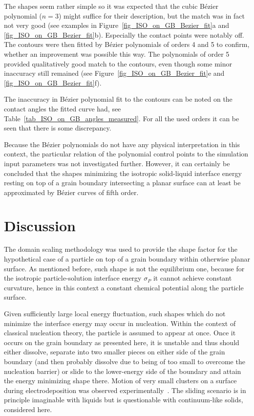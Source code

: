 The shapes seem rather simple so it was expected that the cubic Bézier polynomial ($n=3$) might suffice for their description, but the match was in fact not very good (see examples in Figure~\ref{fig_ISO_on_GB_Bezier_fit}a and \ref{fig_ISO_on_GB_Bezier_fit}b). Especially the contact points were notably off. The contours were then fitted by Bézier polynomials of orders 4 and 5 to confirm, whether an improvement was possible this way. The polynomials of order 5 provided qualitatively good match to the contours, even though some minor inaccuracy still remained (see Figure~\ref{fig_ISO_on_GB_Bezier_fit}e and \ref{fig_ISO_on_GB_Bezier_fit}f). 

The inaccuracy in Bézier polynomial fit to the contours can be noted on the contact angles the fitted curve had, see Table~\ref{tab_ISO_on_GB_angles_measured}. For all the used orders it can be seen that there is some discrepancy.

Because the Bézier polynomials do not have any physical interpretation in this context, the particular relation of the polynomial control points to the simulation input parameters was not investigated further. However, it can certainly be concluded that the shapes minimizing the isotropic solid-liquid interface energy resting on top of a grain boundary intersecting a planar surface can at least be approximated by Bézier curves of fifth order.

\section{Discussion}
The domain scaling methodology was used to provide the shape factor for the hypothetical case of a particle on top of a grain boundary within otherwise planar surface. As mentioned before, such shape is not the equilibrium one, because for the isotropic particle-solution interface energy $\sigma_P$ it cannot achieve constant curvature, hence in this context a constant chemical potential along the particle surface. 

Given sufficiently large local energy fluctuation, such shapes which do not minimize the interface energy may occur in nucleation. Within the context of classical nucleation theory, the particle is assumed to appear at once. Once it occurs on the grain boundary as presented here, it is unstable and thus should either dissolve, separate into two smaller pieces on either side of the grain boundary (and then probably dissolve due to being of too small to overcome the nucleation barrier) or slide to the lower-energy side of the boundary and attain the energy minimizing shape there. Motion of very small clusters on a surface during electrodeposition was observed experimentally~\cite{Ustarroz2013}. The sliding scenario is in principle imaginable with liquids but is questionable with continuum-like solids, considered here. 

